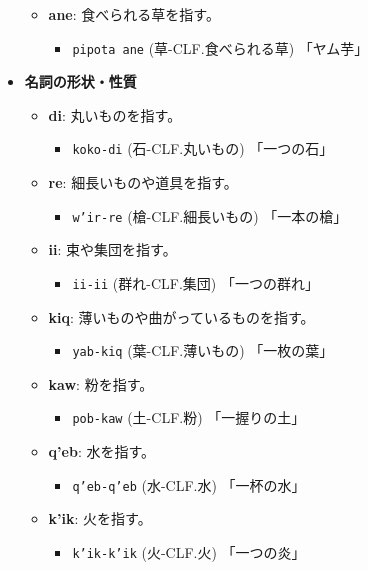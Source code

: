 \begin{itemize}
\begin{itemize}
            \item \textbf{ane}: 食べられる草を指す。
                \begin{itemize}
                    \item \texttt{pipota ane} (草-CLF.食べられる草)
                    \quad 「ヤム芋」
                \end{itemize}
        \end{itemize}
    \item \textbf{名詞の形状・性質}
        \begin{itemize}
            \item \textbf{di}: 丸いものを指す。
                \begin{itemize}
                    \item \texttt{koko-di} (石-CLF.丸いもの) %
                    \quad 「一つの石」
                \end{itemize}
            \item \textbf{re}: 細長いものや道具を指す。
                \begin{itemize}
                    \item \texttt{w'ir-re} (槍-CLF.細長いもの) %
                    \quad 「一本の槍」
                \end{itemize}
            \item \textbf{ii}: 束や集団を指す。
                \begin{itemize}
                    \item \texttt{ii-ii} (群れ-CLF.集団) %
                    \quad 「一つの群れ」
                \end{itemize}
            \item \textbf{kiq}: 薄いものや曲がっているものを指す。
                \begin{itemize}
                    \item \texttt{yab-kiq} (葉-CLF.薄いもの) %
                    \quad 「一枚の葉」
                \end{itemize}
            \item \textbf{kaw}: 粉を指す。
                \begin{itemize}
                    \item \texttt{pob-kaw} (土-CLF.粉) %
                    \quad 「一握りの土」
                \end{itemize}
            \item \textbf{q'eb}: 水を指す。%
                \begin{itemize}
                    \item \texttt{q'eb-q'eb} (水-CLF.水)
                    \quad 「一杯の水」
                \end{itemize}
            \item \textbf{k'ik}: 火を指す。%
                \begin{itemize}
                    \item \texttt{k'ik-k'ik} (火-CLF.火)
                    \quad 「一つの炎」
                \end{itemize}
        \end{itemize}
\end{itemize}
